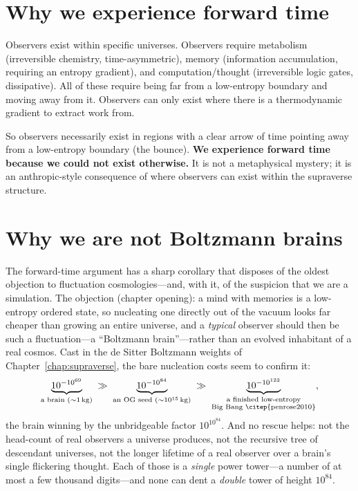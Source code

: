 \section{Why we experience forward time}
\label{sec:why-forward}

Observers exist within specific universes. Observers require metabolism
(irreversible chemistry, time-asymmetric), memory (information accumulation,
requiring an entropy gradient), and computation/thought (irreversible logic
gates, dissipative). All of these require being far from a low-entropy boundary
and moving away from it. Observers can only exist where there is a thermodynamic
gradient to extract work from.

So observers necessarily exist in regions with a clear arrow of time pointing
away from a low-entropy boundary (the bounce). \textbf{We experience forward time
because we could not exist otherwise.} It is not a metaphysical mystery; it is an
anthropic-style consequence of where observers can exist within the supraverse
structure.

\section{Why we are not Boltzmann brains}
\label{sec:not-brains}

The forward-time argument has a sharp corollary that disposes of the oldest
objection to fluctuation cosmologies---and, with it, of the suspicion that we are
a simulation. The objection (chapter opening): a mind with memories is a
low-entropy ordered state, so nucleating one directly out of the vacuum looks far
cheaper than growing an entire universe, and a \emph{typical} observer should
then be such a fluctuation---a ``Boltzmann brain''---rather than an evolved
inhabitant of a real cosmos. Cast in the de Sitter Boltzmann weights of
Chapter~\ref{chap:supraverse}, the bare nucleation costs seem to confirm it:
\begin{equation}
  \underbrace{10^{-10^{69}}}_{\text{a brain }(\sim 1\,\mathrm{kg})}
  \;\gg\;
  \underbrace{10^{-10^{84}}}_{\text{an OG seed }(\sim 10^{15}\,\mathrm{kg})}
  \;\gg\;
  \underbrace{10^{-10^{123}}}_{\substack{\text{a finished low-entropy}\\\text{Big Bang \citep{penrose2010}}}},
  \label{eq:three-towers}
\end{equation}
the brain winning by the unbridgeable factor $10^{10^{84}}$. And no rescue
helps: not the head-count of real observers a universe produces, not the
recursive tree of descendant universes, not the longer lifetime of a real
observer over a brain's single flickering thought. Each of those is a
\emph{single} power tower---a number of at most a few thousand digits---and none
can dent a \emph{double} tower of height $10^{84}$.

